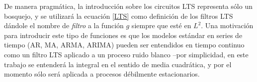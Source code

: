 De manera pragm\'atica, la introducci\'on sobre los circuitos LTS representa s\'olo un bosquejo,
y se utilizar\'a la ecuaci\'on \ref{LTS} como definici\'on de los filtros LTS d\'andole
el nombre de \textit{filtro} a la funci\'on $g$ siempre que est\'e en $L^{2}$.
Una motivaci\'on para introducir este tipo de funciones es que los modelos est\'andar en 
series de tiempo (AR, MA, ARMA, ARIMA) pueden ser entendidos en tiempo continuo como un filtro
LTS aplicado a un proceso ruido blanco --por simplicidad, en este trabajo se entender\'a la integral
en el sentido de media cuadr\'atica, y por el momento s\'olo ser\'a aplicada a procesos 
d\'ebilmente estacionarios.


%

%
%



